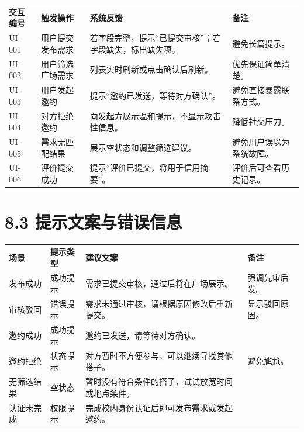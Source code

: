 {\def\LTcaptype{none} %
\begin{xltabular}{\textwidth}{@{}>{\centering\arraybackslash}X>{\centering\arraybackslash}X>{\centering\arraybackslash}X>{\centering\arraybackslash}X@{}}
\toprule\noalign{}
\endhead
\bottomrule\noalign{}
\endlastfoot
\textbf{交互编号} & \textbf{触发操作} & \textbf{系统反馈} &
\textbf{备注} \\
UI-001 & 用户提交发布需求 &
若字段完整，提示``已提交审核''；若字段缺失，标出缺失项。 &
避免长篇提示。 \\
UI-002 & 用户筛选广场需求 & 列表实时刷新或点击确认后刷新。 &
优先保证简单清楚。 \\
UI-003 & 用户发起邀约 & 提示``邀约已发送，等待对方确认''。 &
避免直接暴露联系方式。 \\
UI-004 & 对方拒绝邀约 & 向发起方展示温和提示，不显示攻击性信息。 &
降低社交压力。 \\
UI-005 & 需求无匹配结果 & 展示空状态和调整筛选建议。 &
避免用户误以为系统故障。 \\
UI-006 & 评价提交成功 & 提示``评价已提交，将用于信用摘要''。 &
评价后可查看历史记录。 \\
\end{xltabular}
}

\section{8.3
提示文案与错误信息}\label{ux63d0ux793aux6587ux6848ux4e0eux9519ux8befux4fe1ux606f}

{\def\LTcaptype{none} %
\begin{xltabular}{\textwidth}{@{}>{\centering\arraybackslash}X>{\centering\arraybackslash}X>{\centering\arraybackslash}X>{\centering\arraybackslash}X@{}}
\toprule\noalign{}
\endhead
\bottomrule\noalign{}
\endlastfoot
\textbf{场景} & \textbf{提示类型} & \textbf{建议文案} & \textbf{备注} \\
发布成功 & 成功提示 & 需求已提交审核，通过后将在广场展示。 &
强调先审后发。 \\
审核驳回 & 错误提示 & 需求未通过审核，请根据原因修改后重新提交。 &
显示驳回原因。 \\
邀约成功 & 成功提示 & 邀约已发送，请等待对方确认。 & \\
邀约拒绝 & 状态提示 & 对方暂时不方便参与，可以继续寻找其他搭子。 &
避免尴尬。 \\
无筛选结果 & 空状态 & 暂时没有符合条件的搭子，试试放宽时间或地点条件。
& \\
认证未完成 & 权限提示 & 完成校内身份认证后即可发布需求或发起邀约。 & \\
\end{xltabular}
}

